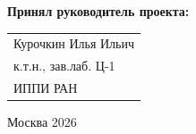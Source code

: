 \begin{titlepage}
\vspace{1em}
{\bf Принял руководитель проекта: \vspace{2mm}}

{
\begin{tabular}{l}
Курочкин Илья Ильич\\
к.т.н., зав.лаб. Ц-1\\
ИППИ РАН 
\end{tabular}}





\vspace{\fill}

\begin{center}
Москва 2026
\end{center}

\end{titlepage}
